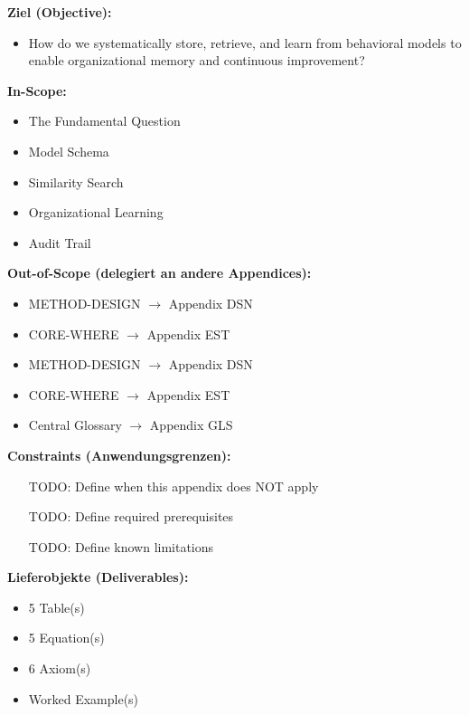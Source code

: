 \begin{tcolorbox}[
    colback=orange!5!white,
    colframe=orange!75!black,
    title={\textbf{Appendix Scope: Ziel / In-Scope / Out-of-Scope / Constraints}},
    fonttitle=\bfseries
]

\textbf{Ziel (Objective):}
\begin{itemize}[nosep]
    \item How do we systematically store, retrieve, and learn from behavioral
models to enable organizational memory and continuous improvement?
\end{itemize}

\textbf{In-Scope:}
\begin{itemize}[nosep]
    \item The Fundamental Question
    \item Model Schema
    \item Similarity Search
    \item Organizational Learning
    \item Audit Trail
\end{itemize}

\textbf{Out-of-Scope (delegiert an andere Appendices):}
\begin{itemize}[nosep]
    \item METHOD-DESIGN $\rightarrow$ Appendix DSN
    \item CORE-WHERE $\rightarrow$ Appendix EST
    \item METHOD-DESIGN $\rightarrow$ Appendix DSN
    \item CORE-WHERE $\rightarrow$ Appendix EST
    \item Central Glossary $\rightarrow$ Appendix GLS
\end{itemize}

\textbf{Constraints (Anwendungsgrenzen):}
\begin{itemize}[nosep]
    \item [TODO: Define when this appendix does NOT apply]
    \item [TODO: Define required prerequisites]
    \item [TODO: Define known limitations]
\end{itemize}

\textbf{Lieferobjekte (Deliverables):}
\begin{itemize}[nosep]
    \item 5 Table(s)
    \item 5 Equation(s)
    \item 6 Axiom(s)
    \item Worked Example(s)
\end{itemize}

\end{tcolorbox}





